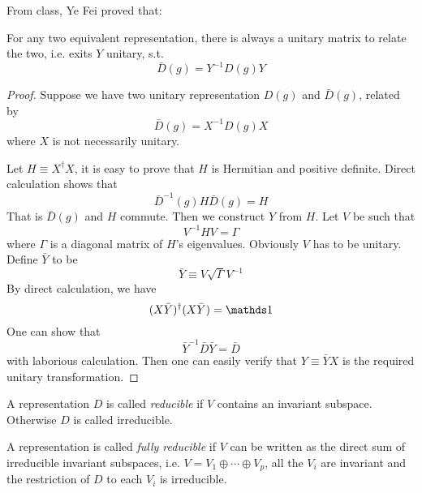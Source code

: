 From class, Ye Fei proved that:
\begin{thm}
    For any two equivalent representation, there is always a unitary
    matrix to relate the two, i.e. exits $Y$ unitary, s.t.
    $$ \bar{D}(g) = Y^{-1} D(g) Y$$
\end{thm}
\begin{proof}
    Suppose we have two unitary representation $D(g)$ and
    $\bar{D}(g)$, related by
    $$ \bar{D}(g) = X^{-1} D(g) X$$
    where $X$ is not necessarily unitary.

    Let $H\equiv X^\dagger X$, it is easy to prove that $H$ is
    Hermitian and positive definite. Direct calculation shows that
    $$ \bar{D}^{-1}(g) H \bar{D}(g) = H$$
    That is $\bar{D}(g)$ and $H$ commute.
    Then we construct $Y$ from $H$. Let $V$ be such that
    \begin{equation}
        V^{-1} H V = \Gamma
    \end{equation}
    where $\Gamma$ is a diagonal matrix of $H$'s eigenvalues.
    Obviously $V$ has to be unitary. Define $\bar{Y}$ to be
    \begin{equation}
        \bar{Y}\equiv V \sqrt{\Gamma} V^{-1}
    \end{equation}
    By direct calculation, we have
    $$ (X\bar{Y})^\dagger (X\bar{Y}) = \id$$
    One can show that
    $$ \bar{Y}^{-1} \bar{D} \bar{Y} = \bar{D}$$
    with laborious calculation. Then one can easily verify that
    $Y\equiv \bar{Y}X$ is the required unitary transformation.
\end{proof}

\begin{defi}
    A representation $D$ is called \textit{reducible} if $V$ contains an
    invariant subspace. Otherwise $D$ is called irreducible.

    A representation is called \textit{fully reducible} if $V$ can be
    written as the direct sum of irreducible invariant subspaces, i.e.
    $V=V_1\oplus \cdots \oplus V_p$, all the $V_i$ are invariant and the
    restriction of $D$ to each $V_i$ is irreducible.
\end{defi}

